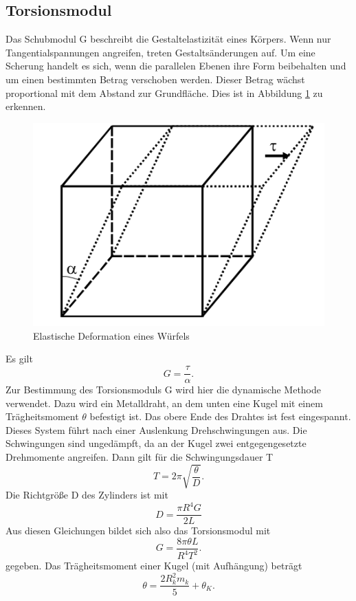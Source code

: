 \documentclass[11pt,ngerman,a4paper]{article}
\begin{document}
\subsection{Torsionsmodul}
Das Schubmodul G beschreibt die Gestaltelastizität eines Körpers. Wenn nur Tangentialspannungen angreifen, treten Gestaltsänderungen auf. Um eine Scherung handelt es sich, wenn die parallelen Ebenen ihre Form beibehalten und um einen bestimmten Betrag verschoben werden. Dieser Betrag wächst proportional mit dem Abstand zur Grundfläche. Dies ist in Abbildung \ref{Abb1} zu erkennen.
\begin{figure}[htp]
\centering
\includegraphics[scale=0.7]{Abb1.png}
\caption{Elastische Deformation eines Würfels}
\label{Abb1}
\end{figure}
Es gilt
\begin{equation}
\label{4}
G = \frac{\tau}{\alpha}.
\end{equation}
Zur Bestimmung des Torsionsmoduls G wird hier die dynamische Methode verwendet. Dazu wird ein Metalldraht, an dem unten eine Kugel mit einem Trägheitsmoment $\theta$ befestigt ist. Das obere Ende des Drahtes ist fest eingespannt. Dieses System führt nach einer Auslenkung Drehschwingungen aus. Die Schwingungen sind ungedämpft, da an der Kugel zwei entgegengesetzte Drehmomente angreifen.
Dann gilt für die Schwingungsdauer T
\begin{equation}
\label{5}
T=2\pi \sqrt{\frac{\theta}{D}}.
\end{equation}
Die Richtgröße D des Zylinders ist mit
\begin{equation}
\label{6}
D=\frac{\pi  R^4 G}{2L}
\end{equation}
Aus diesen Gleichungen bildet sich also das Torsionsmodul mit
\begin{equation}
\label{8}
G=\frac{8\pi\theta L}{R^4T^2}.
\end{equation}
gegeben. Das Trägheitsmoment einer Kugel (mit Aufhängung) beträgt
\begin{equation}
\label{7}
\theta=\frac{2R_k^2m_k}{5}+\theta_K.
\end{equation}
\end{document}
